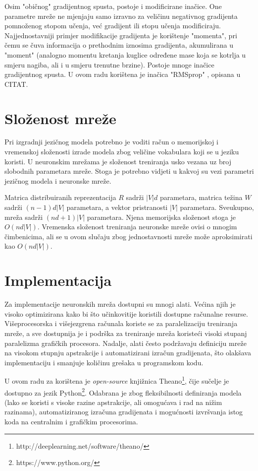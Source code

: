 \documentclass[times, utf8, diplomski, numeric]{fer}
\begin{document}
Osim "običnog" gradijentnog spusta, postoje i modificirane inačice. One parametre mreže ne mjenjaju samo izravno za veličinu negativnog gradijenta pomnoženog stopom učenja, već gradijent ili stopu učenja modificiraju. Najjednostavniji primjer modifikacije gradijenta je korištenje "momenta", pri čemu se čuva informacija o prethodnim iznosima gradijenta, akumulirana u "moment" (analogno momentu kretanja kuglice određene mase koja se kotrlja u smjeru nagiba, ali i u smjeru trenutne brzine). Postoje mnoge inačice gradijentnog spusta. U ovom radu korištena je inačica "RMSprop" , opisana u CITAT.

\section{Složenost mreže}

Pri izgradnji jezičnog modela potrebno je voditi račun o memorijskoj i vremenskoj složenosti izrade modela zbog veličine vokabulara koji se u jeziku koristi. U neuronskim mrežama je složenost treniranja usko vezana uz broj slobodnih parametara mreže. Stoga je potrebno vidjeti u kakvoj su vezi parametri jezičnog modela i neuronske mreže.

Matrica distribuiranih reprezentacija $R$ sadrži $|V| d$ parametara, matrica težina $W$ sadrži $(n - 1) d |V|$ parametara, a vektor pristranosti $|V|$ parametara. Sveukupno, mreža sadrži $(n d + 1) |V|$ parametara. Njena memorijska složenost stoga je $O(n d |V|)$. Vremenska složenost treniranja neuronske mreže ovisi o mnogim čimbenicima, ali se u ovom slučaju zbog jednostavnosti mreže može aproksimirati kao $O(n d |V|)$.

\section{Implementacija}

Za implementacije neuronskih mreža dostupni su mnogi alati. Većina njih je visoko optimizirana kako bi što učinkovitije koristili dostupne računalne resurse. Višeprocesorska i višejezgrena računala koriste se za paralelizaciju treniranja mreže, a sve dostupnija je i podrška za treniranje mreža koristeći visoki stupanj paralelizma grafičkih procesora. Nadalje, alati često podržavaju definiciju mreže na visokom stupnju apstrakcije i automatizirani izračun gradijenata, što olakšava implementaciju i smanjuje količinu grešaka u programskom kodu.

U ovom radu za korištena je \textit{open-source} knjižnica Theano\footnote{http://deeplearning.net/software/theano/}, čije sučelje je dostupno za jezik Python\footnote{https://www.python.org/}. Odabrana je zbog fleksibilnosti definiranja modela (lako se koristi s visoke razine apstrakcije, ali omogućava i rad na nižim razinama), automatiziranog izračuna gradijenata i mogućnosti izvršvanja istog koda na centralnim i grafičkim procesorima.
\end{document}

